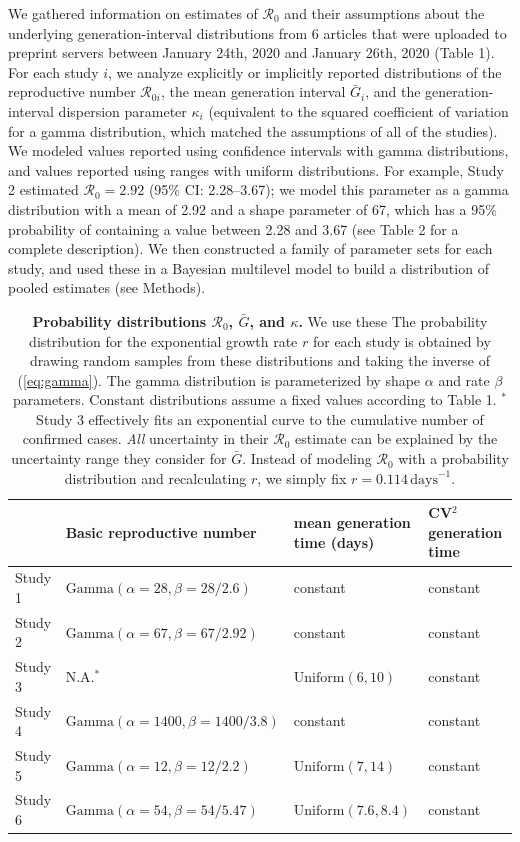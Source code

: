 \documentclass[12pt]{article}
\newcommand{\eref}[1]{(\ref{eq:#1})}
\begin{document}
We gathered information on estimates of $\mathcal R_0$ and their assumptions about the underlying generation-interval distributions from 6 articles that were uploaded to preprint servers between January 24th, 2020 and January 26th, 2020 (Table 1).
For each study $i$, we analyze explicitly or implicitly reported distributions of the reproductive number $\mathcal R_{0i}$, the mean generation interval $\bar G_i$, and the generation-interval dispersion parameter $\kappa_i$ (equivalent to the squared coefficient of variation for a gamma distribution, which matched the assumptions of all of the studies).
We modeled values reported using confidence intervals with gamma distributions, and values reported using ranges with uniform distributions.
For example, Study 2 estimated $\mathcal R_0 = 2.92$ (95\% CI: 2.28--3.67);
we model this parameter as a gamma distribution with a mean of 2.92 and a shape parameter of 67, which has a 95\% probability of containing a value between 2.28 and 3.67 (see Table 2 for a complete description).
We then constructed a family of parameter sets for each study, and used these in a Bayesian multilevel model to build a distribution of pooled estimates (see Methods).

\begin{table}[t]
\begin{center}
\footnotesize
\begin{tabular}{l|l|l|l}
 & Basic reproductive number & mean generation time (days) & CV$^2$ generation time \\
\hline
Study 1 & $\mathrm{Gamma}(\alpha=28, \beta=28/2.6)$ & constant & constant \\
\hline
Study 2 & $\mathrm{Gamma}(\alpha=67, \beta=67/2.92)$ & constant & constant \\
\hline
Study 3 & N.A.$^\ast$ & $\mathrm{Uniform}(6, 10)$ & constant\\
\hline
Study 4 & $\mathrm{Gamma}(\alpha=1400, \beta=1400/3.8)$ & constant & constant \\
\hline
Study 5 & $\mathrm{Gamma}(\alpha=12, \beta=12/2.2)$ & $\mathrm{Uniform}(7, 14)$ & constant\\
\hline
Study 6 & $\mathrm{Gamma}(\alpha=54, \beta=54/5.47)$ & $\mathrm{Uniform}(7.6, 8.4)$ & constant
\end{tabular}
\end{center}
\caption{
\textbf{Probability distributions $\mathcal R_0$, $\bar G$, and $\kappa$.}
We use these 
The probability distribution for the exponential growth rate $r$ for each study is obtained by drawing random samples from these distributions and taking the inverse of \eref{gamma}.
The gamma distribution is parameterized by shape $\alpha$ and rate $\beta$ parameters.
Constant distributions assume a fixed values according to Table 1.
$^\ast$Study 3 effectively fits an exponential curve to the cumulative number of confirmed cases. \emph{All} uncertainty in their $\mathcal R_0$ estimate can be explained by the uncertainty range they consider for $\bar G$. Instead of modeling $\mathcal R_0$ with a probability distribution and recalculating $r$, we simply fix $r=0.114\,\mathrm{days}^{-1}$.
}
\end{table}
\end{document}
